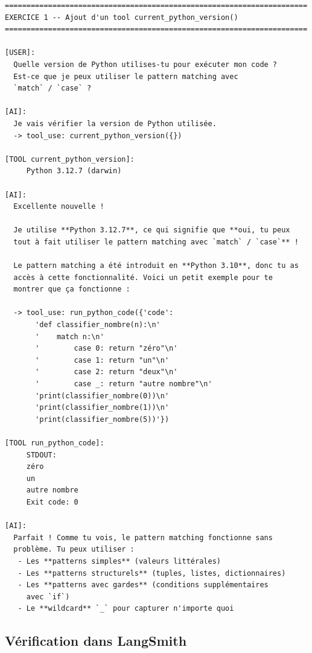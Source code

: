 \documentclass[11pt,a4paper]{article}
\begin{document}
\begin{tcolorbox}[
  colback=white,
  colframe=black!50,
  coltitle=black,
  fonttitle=\footnotesize\bfseries,
  fontupper=\footnotesize,
  title=Sortie de l'exécution,
  breakable,
]
\begin{verbatim}
======================================================================
EXERCICE 1 -- Ajout d'un tool current_python_version()
======================================================================

[USER]:
  Quelle version de Python utilises-tu pour exécuter mon code ?
  Est-ce que je peux utiliser le pattern matching avec
  `match` / `case` ?

[AI]:
  Je vais vérifier la version de Python utilisée.
  -> tool_use: current_python_version({})

[TOOL current_python_version]:
     Python 3.12.7 (darwin)

[AI]:
  Excellente nouvelle !

  Je utilise **Python 3.12.7**, ce qui signifie que **oui, tu peux
  tout à fait utiliser le pattern matching avec `match` / `case`** !

  Le pattern matching a été introduit en **Python 3.10**, donc tu as
  accès à cette fonctionnalité. Voici un petit exemple pour te
  montrer que ça fonctionne :

  -> tool_use: run_python_code({'code':
       'def classifier_nombre(n):\n'
       '    match n:\n'
       '        case 0: return "zéro"\n'
       '        case 1: return "un"\n'
       '        case 2: return "deux"\n'
       '        case _: return "autre nombre"\n'
       'print(classifier_nombre(0))\n'
       'print(classifier_nombre(1))\n'
       'print(classifier_nombre(5))'})

[TOOL run_python_code]:
     STDOUT:
     zéro
     un
     autre nombre
     Exit code: 0

[AI]:
  Parfait ! Comme tu vois, le pattern matching fonctionne sans
  problème. Tu peux utiliser :
   - Les **patterns simples** (valeurs littérales)
   - Les **patterns structurels** (tuples, listes, dictionnaires)
   - Les **patterns avec gardes** (conditions supplémentaires
     avec `if`)
   - Le **wildcard** `_` pour capturer n'importe quoi
\end{verbatim}
\end{tcolorbox}

\subsection{Vérification dans LangSmith}
\end{document}
